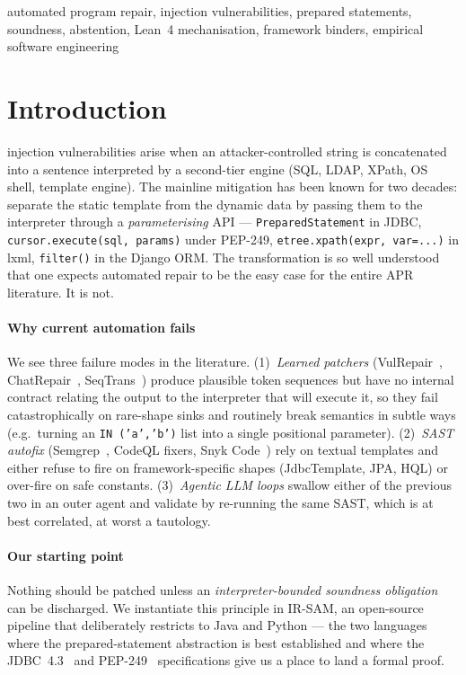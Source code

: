 \documentclass[conference]{IEEEtran}
\newcommand{\IRSAM}{\textsc{IR-SAM}}
\begin{document}
\begin{IEEEkeywords}
automated program repair, injection vulnerabilities, prepared
statements, soundness, abstention, Lean~4 mechanisation, framework
binders, empirical software engineering
\end{IEEEkeywords}

\section{Introduction}\label{sec:intro}

 injection vulnerabilities arise when an
attacker-controlled string is concatenated into a sentence interpreted
by a second-tier engine (SQL, LDAP, XPath, OS shell, template
engine). The mainline mitigation has been known for two decades:
separate the static template from the dynamic data by passing them to
the interpreter through a \emph{parameterising} API ---
\texttt{PreparedStatement} in JDBC, \texttt{cursor.execute(sql, params)}
under PEP-249, \texttt{etree.xpath(expr, var=...)} in lxml,
\texttt{filter()} in the Django ORM. The transformation is so well
understood that one expects automated repair to be the easy case for
the entire APR literature. It is not.

\paragraph*{Why current automation fails}
We see three failure modes in the literature.
(1)~\emph{Learned patchers} (VulRepair~\cite{li_vulrepair_2022},
ChatRepair~\cite{xia_chatrepair_2023},
SeqTrans~\cite{chen_seqtrans_2022}) produce plausible token
sequences but have no internal contract relating the output to the
interpreter that will execute it, so they fail catastrophically on
rare-shape sinks and routinely break semantics in subtle ways (e.g.\
turning an \texttt{IN ('a','b')} list into a single positional
parameter).
(2)~\emph{SAST autofix} (Semgrep~\cite{semgrep_2024}, CodeQL fixers,
Snyk Code~\cite{snyk_codereduce_2023}) rely on textual templates and
either refuse to fire on framework-specific shapes
(JdbcTemplate, JPA, HQL) or over-fire on safe constants.
(3)~\emph{Agentic LLM loops} swallow either of the previous two in an
outer agent and validate by re-running the same SAST, which is at
best correlated, at worst a tautology.

\paragraph*{Our starting point}
Nothing should be patched unless an \emph{interpreter-bounded
soundness obligation} can be discharged. We instantiate this
principle in \IRSAM, an open-source pipeline that deliberately
restricts to Java and Python --- the two languages where the
prepared-statement abstraction is best established and where the
JDBC~4.3~\cite{jdbc_spec_2024} and
PEP-249~\cite{pep_249} specifications give us a place to land a
formal proof.
\end{document}
